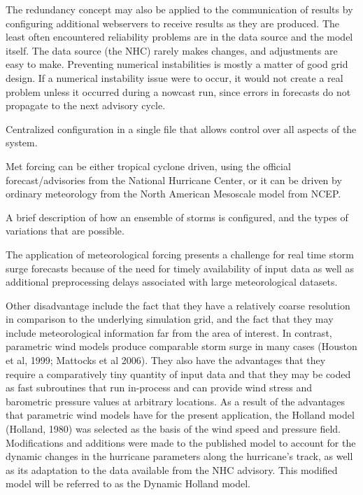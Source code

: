 \documentclass[jmse,article,submit,moreauthors,pdftex,12pt,a4paper]{mdpi}
\begin{document}
The redundancy concept may also be applied to the communication of 
results by configuring additional webservers to receive results as 
they are produced. The least often encountered reliability problems 
are in the data source and the model itself. The data source (the 
NHC) rarely makes changes, and adjustments are easy to make. 
Preventing numerical instabilities is mostly a matter of good grid 
design. If a numerical instability issue were to occur, it would not 
create a real problem unless it occurred during a nowcast run, since 
errors in forecasts do not propagate to the next advisory cycle.

Centralized configuration in a single file that allows control over all
aspects of the system. 

Met forcing can be either tropical cyclone driven, using the official 
forecast/advisories from the National Hurricane Center, or it can be 
driven by ordinary meteorology from the North American Mesoscale model 
from NCEP.

A brief description of how an ensemble of storms is configured, 
and the types of variations that are possible. 

The application of meteorological forcing presents a challenge for 
real time storm surge forecasts because of the need for timely 
availability of input data as well as additional preprocessing 
delays associated with large meteorological datasets. 

Other disadvantage include the fact that they have a relatively 
coarse resolution in comparison to the underlying simulation grid, 
and the fact that they may include meteorological information far 
from the area of interest. In contrast, parametric wind models 
produce comparable storm surge in many cases (Houston et al, 1999; 
Mattocks et al 2006). They also have the advantages that they 
require a comparatively tiny quantity of input data and that they 
may be coded as fast subroutines that run in-process and can provide 
wind stress and barometric pressure values at arbitrary locations. 
As a result of the advantages that parametric wind models have for 
the present application, the Holland model (Holland, 1980) was 
selected as the basis of the wind speed and pressure field. 
Modifications and additions were made to the published model to 
account for the dynamic changes in the hurricane parameters along 
the hurricane’s track, as well as its adaptation to the data 
available from the NHC advisory. This modified model will be 
referred to as the Dynamic Holland model.
\end{document}
